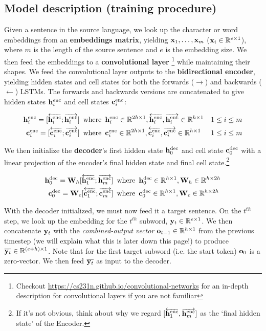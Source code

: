 \subsection*{Model description (training procedure)}
 Given a sentence in the source language, we look up the character or word embeddings from an \textbf{embeddings matrix}, yielding $\mathbf{x}_1, \dots, \mathbf{x}_m$ ($\mathbf{x}_i \in \mathbb{R}^{e \times 1}$), where $m$ is the length of the source sentence and $e$ is the embedding size. We then feed the embeddings to a \textbf{convolutional layer} \footnote{Checkout \url{https://cs231n.github.io/convolutional-networks} for an in-depth description for convolutional layers if you are not familiar} while maintaining their shapes. We feed the convolutional layer outputs to the \textbf{bidirectional encoder}, yielding hidden states and cell states for both the forwards ($\rightarrow$) and backwards ($\leftarrow$) LSTMs. The forwards and backwards versions are concatenated to give hidden states $\mathbf{h}^{\text{enc}}_i$ and cell states $\mathbf{c}^{\text{enc}}_i$:
 
\begin{align}
    \mathbf{h}^{\text{enc}}_i = [\overleftarrow{\mathbf{h}^{\text{enc}}_{i}}; \overrightarrow{\mathbf{h}^{\text{enc}}_{i}}] \enspace &\text{where}\enspace \mathbf{h}^{\text{enc}}_i \in \mathbb{R}^{2h \times 1}, \overleftarrow{\mathbf{h}^{\text{enc}}_{i}}, \overrightarrow{\mathbf{h}^{\text{enc}}_{i}} \in \mathbb{R}^{h \times 1} &1 \le i \le m \\
    \mathbf{c}^{\text{enc}}_i = [\overleftarrow{\mathbf{c}^{\text{enc}}_{i}}; \overrightarrow{\mathbf{c}^{\text{enc}}_{i}}] \enspace &\text{where} \enspace \mathbf{c}^{\text{enc}}_i \in \mathbb{R}^{2h \times 1}, \overleftarrow{\mathbf{c}^{\text{enc}}_{i}}, \overrightarrow{\mathbf{c}^{\text{enc}}_{i}} \in \mathbb{R}^{h \times 1} &1 \le i \le m
\end{align}

We then initialize the \textbf{decoder}'s first hidden state $\mathbf{h}^{\text{dec}}_0$ and cell state $\mathbf{c}^{\text{dec}}_0$ with a linear projection of the encoder's final hidden state and final cell state.\footnote{If it's not obvious, think about why we regard $[\overleftarrow{\mathbf{h}^{\text{enc}}_{1}}, \overrightarrow{\mathbf{h}^{\text{enc}}_{m}}]$ as the `final hidden state' of the Encoder.} 

\begin{align}
    \mathbf{h}^{\text{dec}}_0 = \mathbf{W}_{h}[\overleftarrow{\mathbf{h}^{\text{enc}}_{1}}; \overrightarrow{\mathbf{h}^{\text{enc}}_{m}}] \enspace &\text{where} \enspace \mathbf{h}^{\text{dec}}_0 \in \mathbb{R}^{h \times 1}, \mathbf{W}_{h} \in \mathbb{R}^{h \times 2h}\\
    \mathbf{c}^{\text{dec}}_0 = \mathbf{W}_{c}[\overleftarrow{\mathbf{c}^{\text{enc}}_{1}}; \overrightarrow{\mathbf{c}^{\text{enc}}_{m}}] \enspace &\text{where} \enspace \mathbf{c}^{\text{dec}}_0 \in \mathbb{R}^{h \times 1}, \mathbf{W}_{c} \in \mathbb{R}^{h \times 2h}
\end{align}

With the decoder initialized, we must now feed it a target sentence. On the $t^{th}$ step, we look up the embedding for the $t^{th}$ subword,  $\mathbf{y}_t \in \mathbb{R}^{e \times 1}$. We then concatenate $\mathbf{y}_t$ with the \textit{combined-output vector} $\mathbf{o}_{t-1} \in \mathbb{R}^{h \times 1}$ from the previous timestep (we will explain what this is later down this page!\@) to produce $\overline{\mathbf{y}_t} \in \mathbb{R}^{(e+h) \times 1}$. Note that for the first target subword (i.e. the start token) $\mathbf{o}_{0}$ is a zero-vector. We then feed $\overline{\mathbf{y}_t}$ as input to the decoder. 

